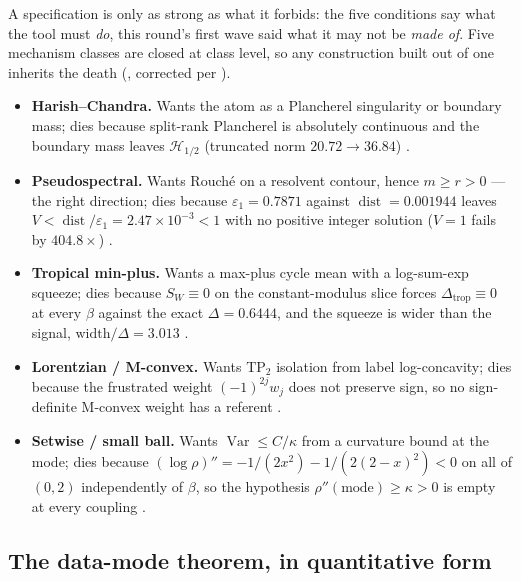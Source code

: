 A specification is only as strong as what it forbids: the five conditions say what the tool must
\emph{do}, this round's first wave said what it may not be \emph{made of}. Five mechanism classes are
closed at class level, so any construction built out of one inherits the death
(, corrected per ).

\begin{itemize}
\item \textbf{Harish--Chandra.} Wants the atom as a Plancherel singularity or boundary mass; dies
  because split-rank Plancherel is absolutely continuous and the boundary mass leaves $\mathcal H_{1/2}$
  (truncated norm $20.72\to36.84$) \LN.
\item \textbf{Pseudospectral.} Wants Rouch\'e on a resolvent contour, hence $m\ge r>0$ --- the right
  direction; dies because $\varepsilon_1=0.7871$ against $\operatorname{dist}=0.001944$ leaves
  $V<\operatorname{dist}/\varepsilon_1=2.47\times10^{-3}<1$ with no positive integer solution
  ($V=1$ fails by $404.8\times$) \LN.
\item \textbf{Tropical min-plus.} Wants a max-plus cycle mean with a log-sum-exp squeeze; dies because
  $S_W\equiv0$ on the constant-modulus slice forces $\Delta_{\mathrm{trop}}\equiv0$ at every $\beta$
  against the exact $\Delta=0.6444$, and the squeeze is wider than the signal,
  $\mathrm{width}/\Delta=3.013$ \LN.
\item \textbf{Lorentzian / M-convex.} Wants TP$_2$ isolation from label log-concavity; dies because the
  frustrated weight $(-1)^{2j}w_j$ does not preserve sign, so no sign-definite M-convex weight has a
  referent \LN.
\item \textbf{Setwise / small ball.} Wants $\operatorname{Var}\le C/\kappa$ from a curvature bound at
  the mode; dies because $(\log\rho)''=-1/(2x^2)-1/(2(2-x)^2)<0$ on all of $(0,2)$ independently of
  $\beta$, so the hypothesis $\rho''(\text{mode})\ge\kappa>0$ is empty at every coupling \LN.
\end{itemize}

\subsection{The data-mode theorem, in quantitative form}

